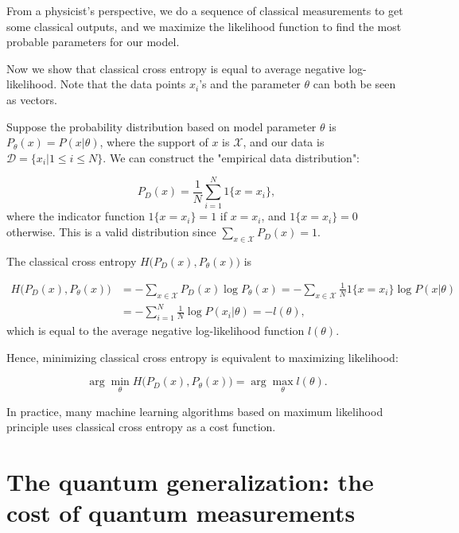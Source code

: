 \documentclass[11pt]{article}
\theoremstyle{definition}
\begin{document}
From a physicist's perspective, we do a sequence of classical measurements to get some classical outputs, and we maximize the likelihood function to find the most probable parameters for our model. 

Now we show that classical cross entropy is equal to average negative log-likelihood. Note that the data points $x_i$'s and the parameter $\theta$ can both be seen as vectors. 

Suppose the probability distribution based on model parameter $\theta$ is $P_{\theta} (x) = P(x|\theta)$, where the support of $x$ is $\mathcal{X}$, and our data is $\mathcal{D} = \{x_i | 1 \leq i \leq N \}$. We can construct the "empirical data distribution":

\begin{equation}
    P_D(x) = \frac{1}{N} \sum_{i = 1}^N
    1\{x = x_i\},
\end{equation}
where the indicator function $1\{x = x_i\} = 1$ if $x = x_i$, and $1\{x = x_i\} = 0$ otherwise. This is a valid distribution since $\sum_{x \in \mathcal{X}} P_D(x)  = 1$.

The classical cross entropy $H\big(P_D(x), P_{\theta}(x)\big)$ is 

\begin{equation}
\begin{split}
    H\big(P_D(x), P_{\theta}(x) \big) 
    &=  -\sum_{x \in \mathcal{X}} P_D(x) \log P_{\theta} (x) 
    =  -\sum_{x \in \mathcal{X}} \frac{1}{N} 1\{x = x_i\} \log P (x | \theta) \\
    &=  -\sum_{i = 1}^N \frac{1}{N} \log P(x_i|\theta) 
    =  -l(\theta),
\end{split}
\end{equation}
which is equal to the average negative log-likelihood function $l(\theta)$.

Hence, minimizing classical cross entropy is equivalent to maximizing likelihood:

\begin{equation}
    \arg \min_{\theta} H\big(P_D(x), P_{\theta}(x)\big) =
    \arg \max_{\theta} l(\theta). 
\end{equation}

In practice, many machine learning algorithms based on maximum likelihood principle uses classical cross entropy as a cost function. 


\section{The quantum generalization: the cost of quantum measurements}\label{qcelllh}
\end{document}
